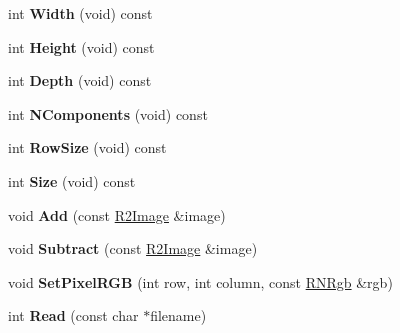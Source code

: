 \begin{DoxyCompactItemize}
\item 
int {\bfseries Width} (void) const \hypertarget{class_r2_image_a5a4e10b7db1c009cdd2fadc8a5dc3ad7}{}\label{class_r2_image_a5a4e10b7db1c009cdd2fadc8a5dc3ad7}

\item 
int {\bfseries Height} (void) const \hypertarget{class_r2_image_a558572cf677fc8453c7097ce5dfa944e}{}\label{class_r2_image_a558572cf677fc8453c7097ce5dfa944e}

\item 
int {\bfseries Depth} (void) const \hypertarget{class_r2_image_ae65be8b46c17dbb4dfe573e1f14bf76b}{}\label{class_r2_image_ae65be8b46c17dbb4dfe573e1f14bf76b}

\item 
int {\bfseries N\+Components} (void) const \hypertarget{class_r2_image_abd9c30364e9403ca9191c2e4b99e75ff}{}\label{class_r2_image_abd9c30364e9403ca9191c2e4b99e75ff}

\item 
int {\bfseries Row\+Size} (void) const \hypertarget{class_r2_image_a2cbb3db23c0bcfd40342718bb76b0741}{}\label{class_r2_image_a2cbb3db23c0bcfd40342718bb76b0741}

\item 
int {\bfseries Size} (void) const \hypertarget{class_r2_image_ae1cd6247a5c1a373ad85f15109112468}{}\label{class_r2_image_ae1cd6247a5c1a373ad85f15109112468}

\item 
void {\bfseries Add} (const \hyperlink{class_r2_image}{R2\+Image} \&image)\hypertarget{class_r2_image_a4b276b2602098800803179a20d6a6166}{}\label{class_r2_image_a4b276b2602098800803179a20d6a6166}

\item 
void {\bfseries Subtract} (const \hyperlink{class_r2_image}{R2\+Image} \&image)\hypertarget{class_r2_image_a7647109295d5c820b777b3643257e070}{}\label{class_r2_image_a7647109295d5c820b777b3643257e070}

\item 
void {\bfseries Set\+Pixel\+R\+GB} (int row, int column, const \hyperlink{class_r_n_rgb}{R\+N\+Rgb} \&rgb)\hypertarget{class_r2_image_a4d27b789c1e8c456b3d12f5dae82e480}{}\label{class_r2_image_a4d27b789c1e8c456b3d12f5dae82e480}

\item 
int {\bfseries Read} (const char $\ast$filename)\hypertarget{class_r2_image_af669279115f3cf428aa0155ab68d6f09}{}\label{class_r2_image_af669279115f3cf428aa0155ab68d6f09}


\end{DoxyCompactItemize}
